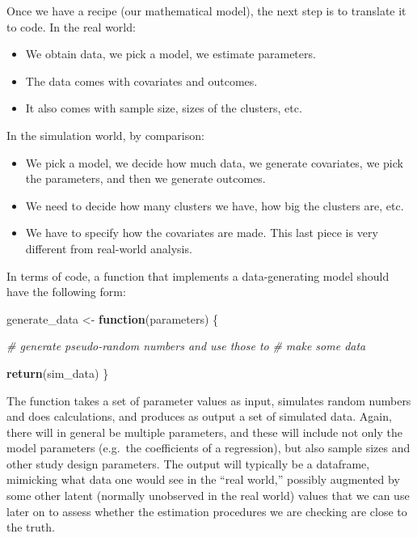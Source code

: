 \documentclass[
]{book}
\newenvironment{Shaded}{\begin{snugshade}}{\end{snugshade}}
\newcommand{\CommentTok}[1]{\textcolor[rgb]{0.56,0.35,0.01}{\textit{#1}}}
\newcommand{\ControlFlowTok}[1]{\textcolor[rgb]{0.13,0.29,0.53}{\textbf{#1}}}
\newcommand{\FunctionTok}[1]{\textcolor[rgb]{0.13,0.29,0.53}{\textbf{#1}}}
\newcommand{\NormalTok}[1]{#1}
\newcommand{\OtherTok}[1]{\textcolor[rgb]{0.56,0.35,0.01}{#1}}
\providecommand{\tightlist}{%
  \setlength{\itemsep}{0pt}\setlength{\parskip}{0pt}}
\begin{document}
Once we have a recipe (our mathematical model), the next step is to translate it to code.
In the real world:

\begin{itemize}
\tightlist
\item
  We obtain data, we pick a model, we estimate parameters.
\item
  The data comes with covariates and outcomes.
\item
  It also comes with sample size, sizes of the clusters, etc.
\end{itemize}

In the simulation world, by comparison:

\begin{itemize}
\tightlist
\item
  We pick a model, we decide how much data, we generate covariates, we pick the parameters, and then we generate outcomes.
\item
  We need to decide how many clusters we have, how big the clusters are, etc.
\item
  We have to specify how the covariates are made. This last piece is very different from real-world analysis.
\end{itemize}

In terms of code, a function that implements a data-generating model should have the following form:

\begin{Shaded}
\begin{Highlighting}[]
\NormalTok{generate\_data }\OtherTok{\textless{}{-}} \ControlFlowTok{function}\NormalTok{(parameters) \{}

  \CommentTok{\# generate pseudo{-}random numbers and use those to}
  \CommentTok{\# make some data}
  
  \FunctionTok{return}\NormalTok{(sim\_data)}
\NormalTok{\}}
\end{Highlighting}
\end{Shaded}

The function takes a set of parameter values as input, simulates random numbers and does calculations, and produces as output a set of simulated data.
Again, there will in general be multiple parameters, and these will include not only the model parameters (e.g.~the coefficients of a regression), but also sample sizes and other study design parameters.
The output will typically be a dataframe, mimicking what data one would see in the ``real world,'' possibly augmented by some other latent (normally unobserved in the real world) values that we can use later on to assess whether the estimation procedures we are checking are close to the truth.
\end{document}
